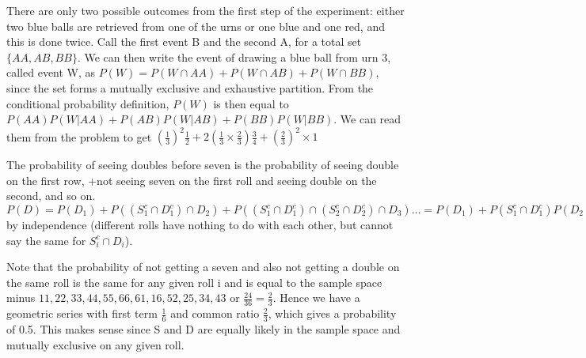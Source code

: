 \documentclass{article}
\begin{document}
\begin{prob}
	There are only two possible outcomes from the first step of the experiment: either two blue balls are retrieved from one of the urns or one blue and one red, and this is done twice. Call the first event B and the second A, for a total set $\{AA, AB, BB\}$.
	We can then write the event of drawing a blue ball from urn 3, called event W, as $P(W)=P(W \cap AA)+P(W \cap AB)+P(W \cap BB)$, since the set forms a mutually exclusive and exhaustive partition.
	From the conditional probability definition, $P(W)$ is then equal to $P(AA)P(W|AA)+P(AB)P(W|AB)+P(BB)P(W|BB)$. We can read them from the problem to get  $(\frac{1}{3})^2\frac{1}{2}+2(\frac{1}{3}\times\frac{2}{3})\frac{3}{4}+(\frac{2}{3})^2\times1$
\end{prob}

\begin{prob}
	The probability of seeing doubles before seven is the probability of seeing double on the first row, +not seeing seven on the first roll and seeing double on the second, and so on.
	$P(D)=P(D_1)+P((S_1^c \cap D_1^c)\cap D_2)+P((S_1^c \cap D_1^c) \cap (S_2^c \cap D_2^c) \cap D_3) \dots = P(D_1)+P(S_1^c \cap D_1^c)P(D_2)+P(S_1^c \cap D_1^c)P(S_2^c \cap D_2^c)P(D_3) \dots$by independence (different rolls have nothing to do with each other, but cannot say the same for $S_i^c \cap D_i$).

	Note that the probability of not getting a seven and also not getting a double on the same roll is the same for any given roll i and is equal to the sample space minus ${11,22,33,44,55,66,61,16,52,25,34,43}$ or $\frac{24}{36}=\frac{2}{3}$.
	Hence we have a geometric series with first term $\frac{1}{6}$ and common ratio $\frac{2}{3}$, which gives a probability of 0.5.
	This makes sense since S and D are equally likely in the sample space and mutually exclusive on any given roll.
\end{prob}
\end{document}
